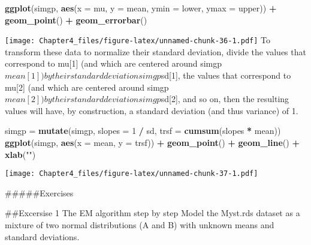 \documentclass[]{article}
\newenvironment{Shaded}{\begin{snugshade}}{\end{snugshade}}
\newcommand{\DataTypeTok}[1]{\textcolor[rgb]{0.13,0.29,0.53}{#1}}
\newcommand{\DecValTok}[1]{\textcolor[rgb]{0.00,0.00,0.81}{#1}}
\newcommand{\FloatTok}[1]{\textcolor[rgb]{0.00,0.00,0.81}{#1}}
\newcommand{\KeywordTok}[1]{\textcolor[rgb]{0.13,0.29,0.53}{\textbf{#1}}}
\newcommand{\NormalTok}[1]{#1}
\newcommand{\OperatorTok}[1]{\textcolor[rgb]{0.81,0.36,0.00}{\textbf{#1}}}
\newcommand{\StringTok}[1]{\textcolor[rgb]{0.31,0.60,0.02}{#1}}
\begin{document}
\begin{Shaded}
\begin{Highlighting}[]
\KeywordTok{ggplot}\NormalTok{(simgp, }\KeywordTok{aes}\NormalTok{(}\DataTypeTok{x =}\NormalTok{ mu, }\DataTypeTok{y =}\NormalTok{ mean, }\DataTypeTok{ymin =}\NormalTok{ lower, }\DataTypeTok{ymax =}\NormalTok{ upper)) }\OperatorTok{+}
\StringTok{  }\KeywordTok{geom_point}\NormalTok{() }\OperatorTok{+}\StringTok{ }\KeywordTok{geom_errorbar}\NormalTok{()}
\end{Highlighting}
\end{Shaded}

\texttt{[image: Chapter4\_files/figure-latex/unnamed-chunk-36-1.pdf]} To
transform these data to normalize their standard deviation, divide the
values that correspond to mu{[}1{]} (and which are centered around
simgp\(mean[1]) by their standard deviation simgp\)sd{[}1{]}, the values
that correspond to mu{[}2{]} (and which are centered around
simgp\(mean[2]) by their standard deviation simgp\)sd{[}2{]}, and so on,
then the resulting values will have, by construction, a standard
deviation (and thus variance) of 1.

\begin{Shaded}
\begin{Highlighting}[]
\NormalTok{simgp =}\StringTok{ }\KeywordTok{mutate}\NormalTok{(simgp,}
  \DataTypeTok{slopes =} \DecValTok{1} \OperatorTok{/}\StringTok{ }\NormalTok{sd,}
  \DataTypeTok{trsf   =} \KeywordTok{cumsum}\NormalTok{(slopes }\OperatorTok{*}\StringTok{ }\NormalTok{mean))}
\KeywordTok{ggplot}\NormalTok{(simgp, }\KeywordTok{aes}\NormalTok{(}\DataTypeTok{x =}\NormalTok{ mean, }\DataTypeTok{y =}\NormalTok{ trsf)) }\OperatorTok{+}
\StringTok{  }\KeywordTok{geom_point}\NormalTok{() }\OperatorTok{+}\StringTok{ }\KeywordTok{geom_line}\NormalTok{() }\OperatorTok{+}\StringTok{ }\KeywordTok{xlab}\NormalTok{(}\StringTok{""}\NormalTok{)}
\end{Highlighting}
\end{Shaded}

\texttt{[image: Chapter4\_files/figure-latex/unnamed-chunk-37-1.pdf]}

\#\#\#\#\#Exercises

\#\#Excersise 1 The EM algorithm step by step Model the Myst.rds dataset
as a mixture of two normal distributions (A and B) with unknown means
and standard deviations.

\begin{Shaded}
\end{Shaded}
\end{document}
